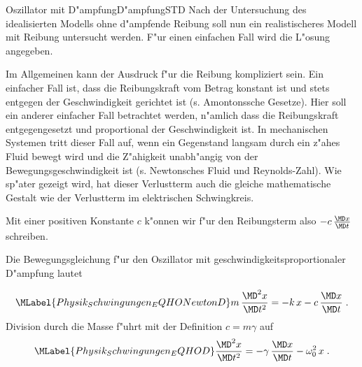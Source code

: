 \begin{MXContent}{Oszillator mit D"ampfung}{D"ampfung}{STD}%
Nach der Untersuchung des idealisierten Modells ohne d"ampfende Reibung soll nun ein realistischeres Modell mit Reibung untersucht werden. F"ur einen einfachen Fall wird die L"osung angegeben.

Im Allgemeinen kann der Ausdruck f"ur die Reibung kompliziert sein. Ein einfacher Fall ist, dass die Reibungskraft vom Betrag konstant ist und stets entgegen der Geschwindigkeit gerichtet ist (s. Amontonssche Gesetze). Hier soll ein anderer einfacher Fall betrachtet werden, n"amlich dass die Reibungskraft entgegengesetzt und proportional der Geschwindigkeit ist. In mechanischen Systemen tritt dieser Fall auf, wenn ein Gegenstand langsam durch ein z"ahes Fluid bewegt wird und die Z"ahigkeit unabh"angig von der Bewegungsgeschwindigkeit ist (s. Newtonsches Fluid und Reynolds-Zahl). Wie sp"ater gezeigt wird, hat dieser Verlustterm auch die gleiche mathematische Gestalt wie der Verlustterm im elektrischen Schwingkreis.

Mit einer positiven Konstante $c$ k"onnen wir f"ur den Reibungsterm also $-c\, \frac{\MD x }{\MD t}$ schreiben. 

\begin{MInfo}
Die Bewegungsgleichung f"ur den Oszillator mit geschwindigkeitsproportionaler D"ampfung lautet

\begin{equation}\MLabel{Physik_Schwingungen_EQHONewtonD}
  m\, \frac{\MD^2 x }{\MD t^2} = -k\,x -c\, \frac{\MD x }{\MD t} \; .
\end{equation}
Division durch die Masse f"uhrt mit der Definition $c=m\gamma$ auf
\begin{equation}\MLabel{Physik_Schwingungen_EQHOD}
  \frac{\MD^2 x }{\MD t^2} = - \gamma \, \frac{\MD x }{\MD t} - \omega_0^2\,x  \; .
\end{equation}

\end{MInfo}


\end{MXContent}
